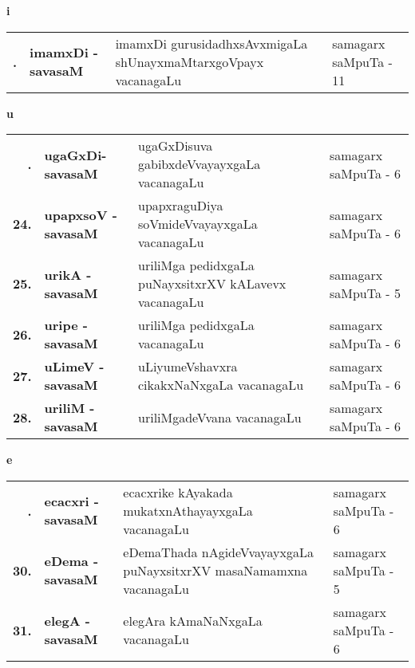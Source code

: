 \centerline{\bf i}

{\renewcommand{\arraystretch}{1.35}
\begin{longtable}{>{\bf}r>{\bf}l>{\raggedright}p{8cm}l}
\endfirsthead
\endhead
\endfoot
\endlastfoot
22. & imamxDi - savasaM & imamxDi gurusidadhxsAvxmigaLa shUnayxmaMtarxgoVpayx vacanagaLu & samagarx saMpuTa - 11\\
\end{longtable}}


\bigskip

\newpage

\centerline{\bf u}

\medskip

{\renewcommand{\arraystretch}{1.3}
\begin{longtable}{>{\bf}r>{\bf}l>{\raggedright}p{8cm}l}
\endfirsthead
\endhead
\endfoot
\endlastfoot
23. &  ugaGxDi- savasaM & ugaGxDisuva gabibxdeVvayayxgaLa vacanagaLu & samagarx saMpuTa - 6\\
24. &  upapxsoV - savasaM & upapxraguDiya soVmideVvayayxgaLa vacanagaLu & samagarx saMpuTa - 6 \\
25. &  urikA - savasaM & uriliMga pedidxgaLa puNayxsitxrXV kALavevx vacanagaLu & samagarx saMpuTa - 5\\
26. &  uripe - savasaM & uriliMga pedidxgaLa vacanagaLu & samagarx saMpuTa - 6\\
27. &  uLimeV - savasaM & uLiyumeVshavxra cikakxNaNxgaLa vacanagaLu & samagarx saMpuTa - 6\\
28. &  uriliM - savasaM & uriliMgadeVvana vacanagaLu & samagarx saMpuTa - 6\\
\end{longtable}}
\bigskip

\centerline{\bf e}

\medskip
{\renewcommand{\arraystretch}{1.3}
\begin{longtable}{>{\bf}r>{\bf}l>{\raggedright}p{8.2cm}l}
\endfirsthead
\endhead
\endfoot
\endlastfoot
29. &  ecacxri - savasaM &  ecacxrike kAyakada mukatxnAthayayxgaLa vacanagaLu & samagarx saMpuTa - 6\\
30. &  eDema - savasaM &  eDemaThada nAgideVvayayxgaLa puNayxsitxrXV masaNamamxna vacanagaLu & samagarx saMpuTa - 5\\
31. &  elegA - savasaM &  elegAra kAmaNaNxgaLa vacanagaLu & samagarx saMpuTa - 6\\
\end{longtable}}
\bigskip

